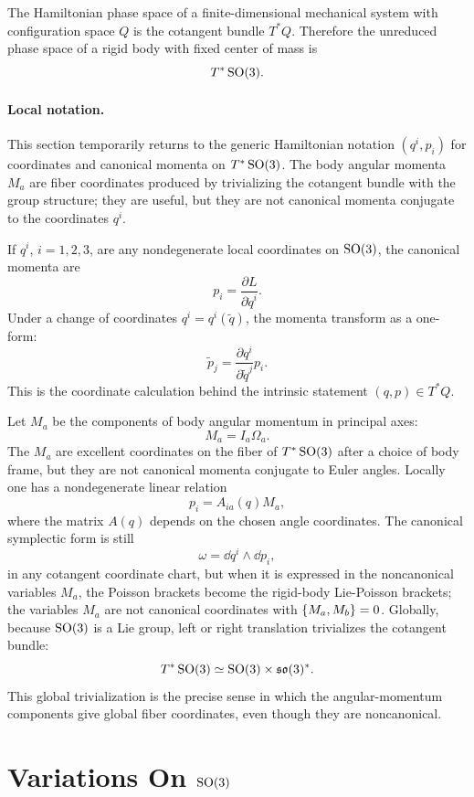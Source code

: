 The Hamiltonian phase space of a finite-dimensional mechanical system with
configuration space \(Q\) is the cotangent bundle \(T^*Q\). Therefore the
unreduced phase space of a rigid body with fixed center of mass is
\[
  T^*\operatorname{SO}(3).
\]

\paragraph{Local notation.}
This section temporarily returns to the generic Hamiltonian notation
\((q^i,p_i)\) for coordinates and canonical momenta on \(T^*\operatorname{SO}(3)\).  The
body angular momenta \(M_a\) are fiber coordinates produced by trivializing the
cotangent bundle with the group structure; they are useful, but they are not
canonical momenta conjugate to the coordinates \(q^i\).

If \(q^i\), \(i=1,2,3\), are any nondegenerate local coordinates on
\(\operatorname{SO}(3)\), the canonical momenta are
\[
  p_i=\frac{\partial L}{\partial \dot q^i}.
\]
Under a change of coordinates \(q^i=q^i(\tilde q)\), the momenta transform as a
one-form:
\[
  \tilde p_j
  =
  \frac{\partial q^i}{\partial \tilde q^j}p_i.
\]
This is the coordinate calculation behind the intrinsic statement
\((q,p)\in T^*Q\).

\begin{remark}
Let \(M_a\) be the components of body angular momentum in principal axes:
\[
  M_a=I_a\Omega_a.
\]
The \(M_a\) are excellent coordinates on the fiber of \(T^*\operatorname{SO}(3)\) after a
choice of body frame, but they are not canonical momenta conjugate to Euler
angles. Locally one has a nondegenerate linear relation
\[
  p_i=A_{ia}(q)M_a,
\]
where the matrix \(A(q)\) depends on the chosen angle coordinates. The canonical
symplectic form is still
\[
  \omega=\dd q^i\wedge \dd p_i,
\]
in any cotangent coordinate chart, but when it is expressed in the
noncanonical variables \(M_a\), the Poisson brackets become the rigid-body
Lie-Poisson brackets; the variables \(M_a\) are not canonical coordinates with
\(\left\{M_a,M_b\right\}=0\).
Globally, because \(\operatorname{SO}(3)\) is a Lie group, left or right translation
trivializes the cotangent bundle:
\[
  T^*\operatorname{SO}(3)\simeq \operatorname{SO}(3)\times\mathfrak{so}(3)^*.
\]
This global trivialization is the precise sense in which the angular-momentum
components give global fiber coordinates, even though they are noncanonical.
\end{remark}

\section{\texorpdfstring{Variations On \(\operatorname{SO}(3)\)}{Variations On SO(3)}}
\label{sec:variations-so3}

